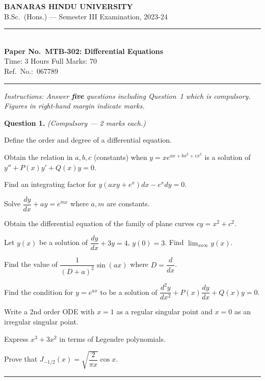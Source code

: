 \documentclass[11pt,a4paper]{article}
\begin{document}
\begin{center}
  {\large\bfseries BANARAS HINDU UNIVERSITY}\\[2pt]
  {\normalsize B.Sc.\ (Hons.) --- Semester III Examination, 2023-24}\\[6pt]
  \rule{0.8\linewidth}{0.5pt}\\[6pt]
  {\large\bfseries Paper No.\ MTB-302: Differential Equations}\\[4pt]
  {\normalsize Time: 3 Hours \hfill Full Marks: 70}\\[2pt]
  {\small Ref.\ No.:\ 067789}
\end{center}
\rule{\linewidth}{0.4pt}
\smallskip



\noindent   \textit{Instructions: Answer   \textbf{five} questions including Question~1 which is compulsory. Figures in right-hand margin indicate marks.}
\bigskip




\noindent   \textbf{Question 1.}   \textit{(Compulsory --- 2 marks each.)}

\begin{parts}
  \item Define the order and degree of a differential equation.
  \item Obtain the relation in $a,b,c$ (constants) when $y=xe^{ax+bx^2+cx^3}$ is a solution of $y''+P(x)y'+Q(x)y=0$.
  \item Find an integrating factor for $y(axy+e^x)dx - e^x dy=0$.
  \item Solve $\dfrac{dy}{dx}+ay=e^{mx}$ where $a,m$ are constants.
  \item Obtain the differential equation of the family of plane curves $cy=x^2+c^2$.
  \item Let $y(x)$ be a solution of $\dfrac{dy}{dx}+3y=4$, $y(0)=3$. Find $\lim_{x o\infty}y(x)$.
  \item Find the value of $\dfrac{1}{(D+a)^2}\sin(ax)$ where $D=\dfrac{d}{dx}$.
  \item Find the condition for $y=e^{ax}$ to be a solution of $\dfrac{d^2y}{dx^2}+P(x)\dfrac{dy}{dx}+Q(x)y=0$.
  \item Write a 2nd order ODE with $x=1$ as a regular singular point and $x=0$ as an irregular singular point.
  \item Express $x^3+3x^2$ in terms of Legendre polynomials.
  \item Prove that $J_{-1/2}(x)=\sqrt{\dfrac{2}{\pi x}}\cos x$.
\end{parts}
\medskip\rule{\linewidth}{0.2pt}
\end{document}
